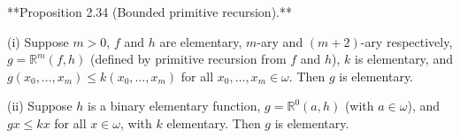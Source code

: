 **Proposition 2.34 (Bounded primitive recursion).**

(i) Suppose $m > 0$, $f$ and $h$ are elementary, $m$-ary and $(m + 2)$-ary respectively, $g = \mathbb{R}^m(f, h)$ (defined by primitive recursion from $f$ and $h$), $k$ is elementary, and $g(x_0, \ldots, x_m) \leq k(x_0, \ldots, x_m)$ for all $x_0, \ldots, x_m \in \omega$. Then $g$ is elementary.

(ii) Suppose $h$ is a binary elementary function, $g = \mathbb{R}^0(a, h)$ (with $a \in \omega$), and $gx \leq kx$ for all $x \in \omega$, with $k$ elementary. Then $g$ is elementary.
